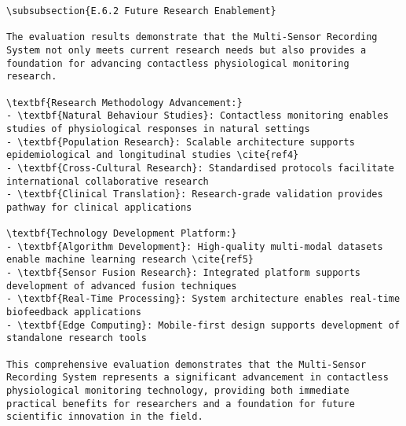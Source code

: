 \begin{verbatim}
\subsubsection{E.6.2 Future Research Enablement}

The evaluation results demonstrate that the Multi-Sensor Recording System not only meets current research needs but also provides a foundation for advancing contactless physiological monitoring research.

\textbf{Research Methodology Advancement:}
- \textbf{Natural Behaviour Studies}: Contactless monitoring enables studies of physiological responses in natural settings
- \textbf{Population Research}: Scalable architecture supports epidemiological and longitudinal studies \cite{ref4}
- \textbf{Cross-Cultural Research}: Standardised protocols facilitate international collaborative research
- \textbf{Clinical Translation}: Research-grade validation provides pathway for clinical applications

\textbf{Technology Development Platform:}
- \textbf{Algorithm Development}: High-quality multi-modal datasets enable machine learning research \cite{ref5}
- \textbf{Sensor Fusion Research}: Integrated platform supports development of advanced fusion techniques
- \textbf{Real-Time Processing}: System architecture enables real-time biofeedback applications
- \textbf{Edge Computing}: Mobile-first design supports development of standalone research tools

This comprehensive evaluation demonstrates that the Multi-Sensor Recording System represents a significant advancement in contactless physiological monitoring technology, providing both immediate practical benefits for researchers and a foundation for future scientific innovation in the field.
\end{verbatim}
